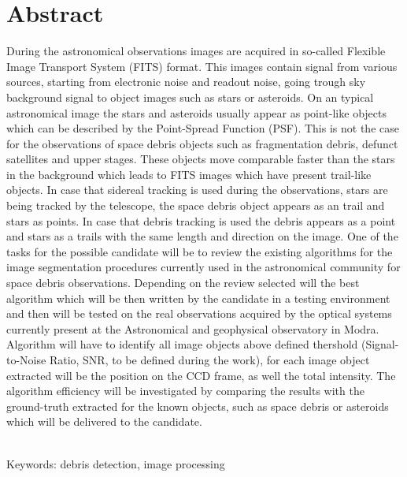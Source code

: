 \documentclass[12pt, a4paper, oneside]{book}
\begin{document}
\chapter*{Abstract}\label{chap:abstract_en}
During the astronomical observations images are acquired in so-called Flexible Image Transport System (FITS) format. This images contain signal from various sources, starting from electronic noise and readout noise, going trough sky background signal to object images such as stars or asteroids. On an typical astronomical image the stars and asteroids usually appear as point-like objects which can be described by the Point-Spread Function (PSF). This is not the case for the observations of space debris objects such as fragmentation debris, defunct satellites and upper stages. These objects move comparable faster than the stars in the background which leads to FITS images which have present trail-like objects. In case that sidereal tracking is used during the observations, stars are being tracked by the telescope, the space debris object appears as an trail and stars as points. In case that debris tracking is used the debris appears as a point and stars as a trails with the same length and direction on the image. One of the tasks for the possible candidate will be to review the existing algorithms for the image segmentation procedures currently used in the astronomical community for space debris observations. Depending on the review selected will the best algorithm which will be then written by the candidate in a testing environment and then will be tested on the real observations acquired by the optical systems currently present at the Astronomical and geophysical observatory in Modra. Algorithm will have to identify all image objects above defined thershold (Signal-to-Noise Ratio, SNR, to be defined during the work), for each image object extracted will be the position on the CCD frame, as well the total intensity. The algorithm efficiency will be investigated by comparing the results with the ground-truth extracted for the known objects, such as space debris or asteroids which will be delivered to the candidate.


~\\
Keywords: debris detection, image processing
\vfill\eject 

\tableofcontents

\mainmatter

% 
% 
% 
% 
% 
% 
% 
% 

\backmatter

\nocite{*}



\listoffigures
\end{document}
